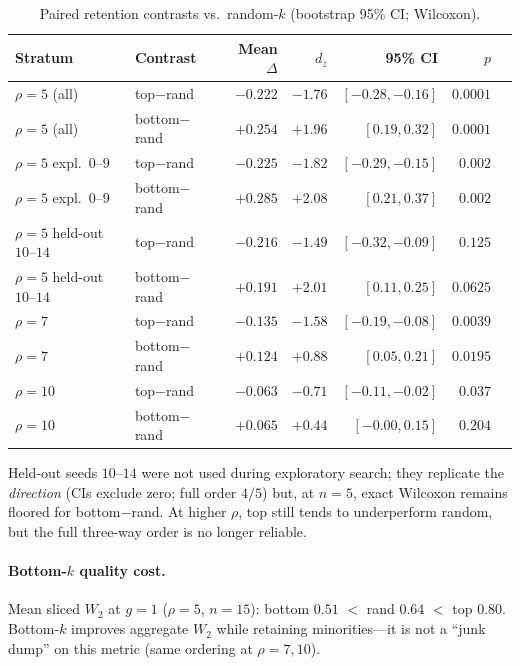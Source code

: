 \documentclass[11pt]{article}
\begin{document}
\begin{table}[t]
\centering
\caption{Paired retention contrasts vs.\ random-$k$ (bootstrap 95\% CI; Wilcoxon).}
\label{tab:strat}
\begin{tabular}{llrrrrr}
\toprule
Stratum & Contrast & Mean $\Delta$ & $d_z$ & 95\% CI & $p$ \\
\midrule
$\rho{=}5$ (all) & top$-$rand & $-0.222$ & $-1.76$ & $[{-}0.28,{-}0.16]$ & $0.0001$ \\
$\rho{=}5$ (all) & bottom$-$rand & $+0.254$ & $+1.96$ & $[0.19,0.32]$ & $0.0001$ \\
$\rho{=}5$ expl.\ $0$--$9$ & top$-$rand & $-0.225$ & $-1.82$ & $[{-}0.29,{-}0.15]$ & $0.002$ \\
$\rho{=}5$ expl.\ $0$--$9$ & bottom$-$rand & $+0.285$ & $+2.08$ & $[0.21,0.37]$ & $0.002$ \\
$\rho{=}5$ held-out $10$--$14$ & top$-$rand & $-0.216$ & $-1.49$ & $[{-}0.32,{-}0.09]$ & $0.125$ \\
$\rho{=}5$ held-out $10$--$14$ & bottom$-$rand & $+0.191$ & $+2.01$ & $[0.11,0.25]$ & $0.0625$ \\
$\rho{=}7$ & top$-$rand & $-0.135$ & $-1.58$ & $[{-}0.19,{-}0.08]$ & $0.0039$ \\
$\rho{=}7$ & bottom$-$rand & $+0.124$ & $+0.88$ & $[0.05,0.21]$ & $0.0195$ \\
$\rho{=}10$ & top$-$rand & $-0.063$ & $-0.71$ & $[{-}0.11,{-}0.02]$ & $0.037$ \\
$\rho{=}10$ & bottom$-$rand & $+0.065$ & $+0.44$ & $[{-}0.00,0.15]$ & $0.204$ \\
\bottomrule
\end{tabular}
\end{table}

Held-out seeds $10$--$14$ were not used during exploratory search; they replicate the \emph{direction} (CIs exclude zero; full order $4/5$) but, at $n{=}5$, exact Wilcoxon remains floored for bottom$-$rand.
At higher $\rho$, top still tends to underperform random, but the full three-way order is no longer reliable.

\paragraph{Bottom-$k$ quality cost.}
Mean sliced $W_2$ at $g{=}1$ ($\rho{=}5$, $n{=}15$): bottom $0.51$ $<$ rand $0.64$ $<$ top $0.80$.
Bottom-$k$ improves aggregate $W_2$ while retaining minorities---it is not a ``junk dump'' on this metric (same ordering at $\rho{=}7,10$).
\end{document}
